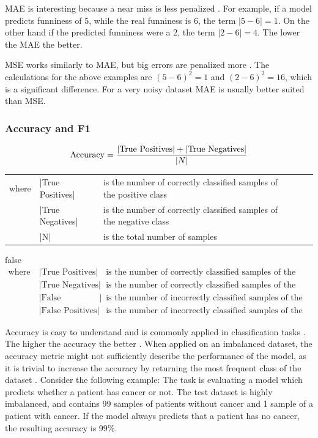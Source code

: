\documentclass[draft,final,oneside]{vutinfth} %
\begin{document}
MAE is interesting because a near miss is less penalized \cite{accuracy}. For example, if a model predicts funniness of 5, while the real funniness is 6, the term $\mid 5 - 6 \mid = 1$. On the other hand if the predicted funniness were a 2, the term $\mid 2 - 6 \mid = 4$. The lower the MAE the better.

MSE works similarly to MAE, but big errors are penalized more \cite{accuracy}. The calculations for the above examples are $\left( 5 - 6 \right)^2 = 1$ and $\left( 2 - 6 \right)^2 = 16$, which is a significant difference. For a very noisy dataset MAE is usually better suited than MSE.

\subsubsection{Accuracy and F1}
\begin{equation}
\text{Accuracy}=\frac{|\text{True Positives}| + |\text{True Negatives}|} {|N|}\\
\end{equation}
\FloatBarrier
\begin{table}[h]
\begin{tabular}{lllll}
where & |True Positives| & is the number of correctly classified samples of the positive class \\
 & |True Negatives| & is the number of correctly classified samples of the negative class \\
 & |N| & is the total number of samples
\end{tabular}
\end{table}
\FloatBarrier
\if false
\begin{align*}
\text{where}~&|\text{True Positives}|&~\text{is the number of correctly classified samples of the positive class} \\
&|\text{True Negatives}|&~\text{is the number of correctly classified samples of the negative class} \\
&|\text{False Negatives}|&~\text{is the number of incorrectly classified samples of the negative class} \\
&|\text{False Positives}|&~\text{is the number of incorrectly classified samples of the positive class}
\end{align*}
\fi

Accuracy is easy to understand and is commonly applied in classification tasks \cite{accuracy}. The higher the accuracy the better \cite{Powers2008EvaluationFP}. When applied on an imbalanced dataset, the accuracy metric might not sufficiently describe the performance of the model, as it is trivial to increase the accuracy by returning the most frequent class of the dataset \cite{accuracy}. Consider the following example: The task is evaluating a model which predicts whether a patient has cancer or not. The test dataset is highly imbalanced, and contains 99 samples of patients without cancer and 1 sample of a patient with cancer. If the model always predicts that a patient has no cancer, the resulting accuracy is 99\%. 
\end{document}
